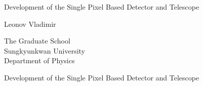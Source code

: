 \begin{titlepage}


\newpage
\vspace*{1.5cm}
\begin{center}
{\fontsize{22}{26}\selectfont Development of the Single Pixel Based Detector and Telescope}
\end{center}


\vspace{15em}
\begin{center}
{\fontsize{16}{16}\selectfont
Leonov Vladimir 
}
\end{center}

\vspace{10cm}




\begin{center}

{\fontsize{16}{16}\selectfont
The Graduate School \\
Sungkyunkwan University \\
Department of Physics\\
}

\end{center}


\afterpage{\blankpage}

\vspace*{1cm}
\begin{center}
{\fontsize{22}{26}\selectfont Development of the Single Pixel Based Detector and Telescope}
\end{center}


\end{titlepage}
